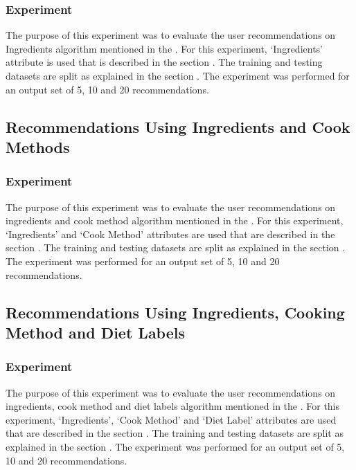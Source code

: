 \subsubsection{Experiment}
\label{sec:cb_ingred_exp}
The purpose of this experiment was to evaluate the user recommendations on Ingredients algorithm mentioned in the . For this experiment, \lq{}Ingredients\rq{} attribute is used that is described in the section . The training and testing datasets are split as explained in the section . The experiment was performed for an output set of 5, 10 and 20 recommendations. 

\subsection{Recommendations Using Ingredients and Cook Methods}
\label{sec:cb_ingredients_cook_method}
\subsubsection{Experiment}
\label{sec:cb_ingred_cook_method_exp}
The purpose of this experiment was to evaluate the user recommendations on ingredients and cook method  algorithm mentioned in the . For this experiment, \lq{}Ingredients\rq{} and \lq{}Cook Method\rq{} attributes are used that are described in the section . The training and testing datasets are split as explained in the section . The experiment was performed for an output set of 5, 10 and 20 recommendations. 

\subsection{Recommendations Using Ingredients, Cooking Method and Diet Labels}
\label{sec:cb_ingredients_cook_method_diet_labels}
\subsubsection{Experiment}
\label{sec:cb_ingred_cook_method_diet_label_exp}
The purpose of this experiment was to evaluate the user recommendations on ingredients, cook method  and diet labels algorithm mentioned in the . For this experiment, \lq{}Ingredients\rq{}, \lq{}Cook Method\rq{} and \lq{}Diet Label\rq{} attributes are used that are described in the section . The training and testing datasets are split as explained in the section . The experiment was performed for an output set of 5, 10 and 20 recommendations. 